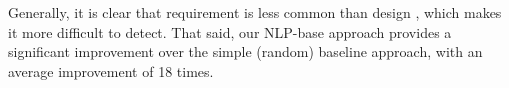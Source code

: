 Generally, it is clear that requirement \SATD is less common than design \SATD, which makes it more difficult to detect. That said, our NLP-base approach provides a significant improvement over the simple (random) baseline approach, with an average improvement of 18 times.







